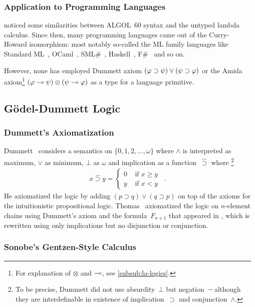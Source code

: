 \subsubsection{Application to Programming Languages}

\citet{landin1965} noticed some similarities between ALGOL~60 syntax and
the untyped lambda calculus.
Since then, many programming languages came out of the Curry-Howard
isomorphism:  most notably so-called the ML family languages like
Standard ML~\citep{milner1997definition},
OCaml~\citep{minsky2011}, SML\#~\citep{ohori2011},
Haskell~\citep{marlow2010haskell}, F\#~\citep{fsharp} and so on.

However, none has employed Dummett axiom
$(\varphi\supset\psi)\lor(\psi\supset\varphi)$
or the Amida axiom\footnote{For explanation of $\otimes$ and $\multimap$, see \ref{subsub:la-logics}.}
$(\varphi\multimap\psi)\otimes(\psi\multimap\varphi)$
as a type for a language primitive.

\subsection{G\"odel-Dummett Logic}
\subsubsection{Dummett's Axiomatization}
Dummett~\cite{dummett59} considers a semantics on $\{0,1,2,\ldots,\omega\}$ where
$\wedge$ is interpreted as maximum, $\vee$ as minimum, $\bot$ as $\omega$
 and implication as a function~$\hat\supset$ where%
\footnote{To be precise, Dummett did not use absurdity~$\bot$ but negation~$\neg$
although they are interdefinable in existence of implication~$\supset$
and conjunction~$\wedge$.}
\begin{align*}
 x \hat\supset y= \begin{cases}
		    0 &\text{ if } x\ge y \\
		    y &\text{ if } x < y
		  \end{cases}\enspace.
\end{align*}
He axiomatized the logic by adding $(p\supset q)\lor(q\supset p)$ on top
of the axioms for the intuitionistic propositional logic.
Thomas~\citep{thomas1962} axiomatized
 the logic on $n$-element chains using Dummett's axiom and the
 formula~$F_{n+1}$ that appeared in \citet{godelprop},
 which is rewritten using only implications but no disjunction or conjunction.

\subsubsection{Sonobe's Gentzen-Style Calculus}


